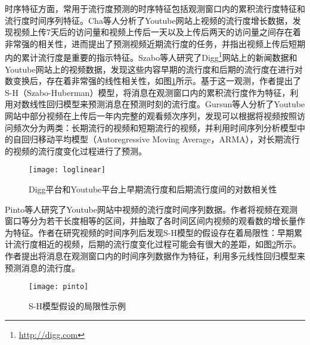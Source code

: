 时序特征方面，常用于流行度预测的时序特征包括观测窗口内的累积流行度特征和流行度时间序列特征。Cha等人\citep{cha2009analyzing}分析了Youtube网站上视频的流行度增长数据，发现视频上传7天后的访问量和视频上传后一天以及上传后两天的访问量之间存在着非常强的相关性，进而提出了预测视频近期流行度的任务，并指出视频上传后短期内的累计流行度是重要的指示特征。Szabo等人\citep{szabo2010predicting}研究了Digg\footnote{\url{http://digg.com}}网站上的新闻数据和Youtube网站上的视频数据，发现这些内容早期的流行度和后期的流行度在进行对数变换后，存在着非常强的线性相关性，如图\ref{fig:loglinear}所示。基于这一观测，作者提出了S-H（Szabo-Huberman）模型，将消息在观测窗口内的累积流行度作为特征，利用对数线性回归模型来预测消息在预测时刻的流行度。Gursun等人\citep{gursun2011describing}分析了Youtube网站中部分视频在上传后一年内完整的观看频次序列，发现可以根据将视频按照访问频次分为两类：长期流行的视频和短期流行的视频，并利用时间序列分析模型中的自回归移动平均模型（Autoregressive Moving Average，ARMA）\citep{marple1987digital}，对长期流行的视频的流行度变化过程进行了预测。
\begin{figure}[!htbp]
  \centering
  \texttt{[image: loglinear]}
  \caption{Digg平台和Youtube平台上早期流行度和后期流行度间的对数相关性\citep{sh2008Corr}}
  \label{fig:loglinear}
\end{figure}

Pinto等人\citep{pinto2013using}研究了Youtube网站中视频的流行度时间序列数据。作者将视频在观测窗口等分为若干长度相等的区间，并抽取了各时间区间内视频的观看数的增长量作为特征。作者在研究视频的时间序列后发现S-H模型的假设存在着局限性：早期累计流行度相近的视频，后期的流行度变化过程可能会有很大的差距，如图\ref{fig:pinto}所示。作者提出将消息在观测窗口内的时间序列数据作为特征，利用多元线性回归模型来预测消息的流行度。
\begin{figure}[!htbp]
  \centering
  \texttt{[image: pinto]}
  \caption{S-H模型假设的局限性示例\citep{pinto2013using}}
  \label{fig:pinto}
\end{figure}

